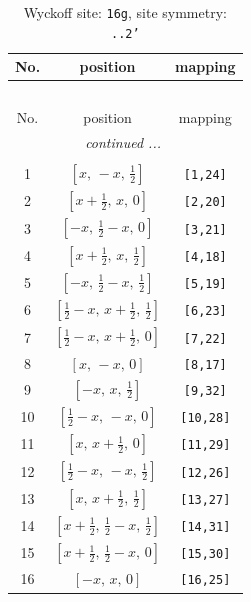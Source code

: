 \documentclass[fleqn,8pt]{jsarticle}
\begin{document}
\begin{longtable}{ccc}
\caption{Wyckoff site: {\tt 16g}, site symmetry: {\tt ..2'}}
 \\
 \hline \hline
No. & position & mapping \\ \hline \endfirsthead

\multicolumn{2}{l}{\tablename\ \thetable{}} \\
 \hline \hline
No. & position & mapping \\ \hline \endhead

 \hline \hline
\multicolumn{2}{r}{\footnotesize\it continued ...} \\ \endfoot

 \hline \hline
\multicolumn{2}{r}{} \\ \endlastfoot

1 & $\left[ x,\, - x,\, \frac{1}{2} \right]$ & {\tt [1,24]} \\ \hline
2 & $\left[ x + \frac{1}{2},\, x,\, 0 \right]$ & {\tt [2,20]} \\ \hline
3 & $\left[ - x,\, \frac{1}{2} - x,\, 0 \right]$ & {\tt [3,21]} \\ \hline
4 & $\left[ x + \frac{1}{2},\, x,\, \frac{1}{2} \right]$ & {\tt [4,18]} \\ \hline
5 & $\left[ - x,\, \frac{1}{2} - x,\, \frac{1}{2} \right]$ & {\tt [5,19]} \\ \hline
6 & $\left[ \frac{1}{2} - x,\, x + \frac{1}{2},\, \frac{1}{2} \right]$ & {\tt [6,23]} \\ \hline
7 & $\left[ \frac{1}{2} - x,\, x + \frac{1}{2},\, 0 \right]$ & {\tt [7,22]} \\ \hline
8 & $\left[ x,\, - x,\, 0 \right]$ & {\tt [8,17]} \\ \hline
9 & $\left[ - x,\, x,\, \frac{1}{2} \right]$ & {\tt [9,32]} \\ \hline
10 & $\left[ \frac{1}{2} - x,\, - x,\, 0 \right]$ & {\tt [10,28]} \\ \hline
11 & $\left[ x,\, x + \frac{1}{2},\, 0 \right]$ & {\tt [11,29]} \\ \hline
12 & $\left[ \frac{1}{2} - x,\, - x,\, \frac{1}{2} \right]$ & {\tt [12,26]} \\ \hline
13 & $\left[ x,\, x + \frac{1}{2},\, \frac{1}{2} \right]$ & {\tt [13,27]} \\ \hline
14 & $\left[ x + \frac{1}{2},\, \frac{1}{2} - x,\, \frac{1}{2} \right]$ & {\tt [14,31]} \\ \hline
15 & $\left[ x + \frac{1}{2},\, \frac{1}{2} - x,\, 0 \right]$ & {\tt [15,30]} \\ \hline
16 & $\left[ - x,\, x,\, 0 \right]$ & {\tt [16,25]} \\
\end{longtable}
\end{document}
